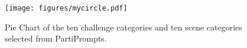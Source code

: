 \begin{figure}[t]
  \centering
  \texttt{[image: figures/mycircle.pdf]}
  \caption{Pie Chart of the ten challenge categories and ten scene categories selected from PartiPrompts\cite{yu2022scaling}. }
\end{figure}